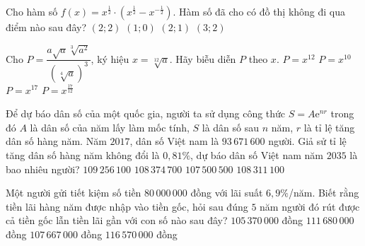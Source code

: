 \begin{ex}%
	Cho  hàm số $f(x)=x^{\frac{1}{2}}\cdot\left(x^{\frac{1}{2}}-x^{-\frac{1}{2}}\right)$. Hàm số đã cho có đồ thị không đi qua điểm nào sau đây?
	\choice 
		{\True $(2; 2)$} 
		 {$(1; 0)$}
		 {$(2; 1)$}
		{$(3; 2)$} 
\end{ex}

\begin{ex}%
	Cho $P=\dfrac{a \sqrt{a} \sqrt[3]{a^2}}{(\sqrt[4]{a})^3}$, ký hiệu $x=\sqrt[12]{a}$. Hãy biễu  diễn $P$ theo $x$.
	 \choice
		{$P=x^{12}$} 
		{$P=x^{10}$} 
		{\True  $P=x^{17}$}
		 {$P=x^{\tfrac{17}{12}}$}
\end{ex}

\begin{ex}%
	Để dự báo dân số của một quốc gia, người ta sử dụng công thức $S=A\mathrm{e}^{nr}$ trong đó $A$ là dân  số của năm lấy làm mốc tính, $S$ là dân số sau $n$ năm, $r$ là tỉ lệ tăng dân số hàng năm. Năm $2017$, dân số Việt nam là $93\,671\,600$ người. Giả sử tỉ lệ tăng dân số hàng năm không đổi là $0{,}81\%$, dự báo dân số Việt nam năm $2035$ là bao nhiêu người?
	\choice 
		{$109\,256\,100$} 
		{\True  $108\,374\,700$}
		{$107\,500\,500$} 
		{$108\,311\,100$} 
\end{ex}

\begin{ex}%
	 Một người gửi tiết kiệm số tiền $80\,000\,000$ đồng với lãi suất $6{,}9\%$/năm. Biết rằng tiền lãi hàng năm được nhập vào tiền gốc, hỏi sau đúng $5$ năm người đó rút được cả tiền gốc lẫn tiền lãi gần với con số nào sau đây?
	\choice 
		{$105\,370\,000$  đồng}
		{\True $111\,680\,000$ đồng} 
		{$107\,667\,000$  đồng}
		{$116\,570\,000$  đồng}
\end{ex}


